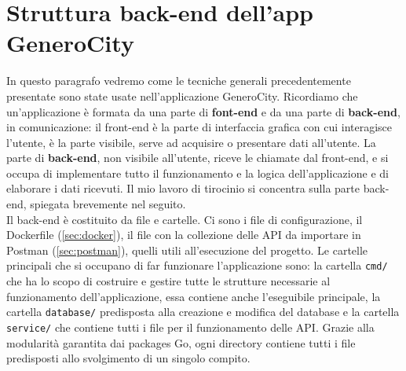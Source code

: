 \documentclass[italian, Lau, oneside, nodefaultfont, noexaminfo]{sapthesis}
\begin{document}




\section{Struttura back-end dell'app GeneroCity}

In questo paragrafo vedremo come le tecniche generali precedentemente presentate sono state usate nell'applicazione GeneroCity. Ricordiamo che un'applicazione \`e formata da una parte  di \textbf{font-end} e da una parte  di \textbf{back-end}, in comunicazione: il front-end  \`e la parte di interfaccia grafica con cui interagisce l'utente, \`e la parte visibile,  serve ad acquisire o presentare   dati  all'utente. La parte  di \textbf{back-end}, non visibile all'utente,  riceve le chiamate dal front-end, e si occupa di implementare tutto il funzionamento e la logica dell'applicazione e di elaborare i dati ricevuti. Il mio lavoro di tirocinio si concentra sulla parte back-end, spiegata brevemente nel seguito.\\

Il back-end è costituito da file e cartelle. Ci sono i file di configurazione, il Dockerfile (\autoref{sec:docker}), il file con la collezione delle API da importare in Postman (\autoref{sec:postman}), quelli utili all'esecuzione del progetto. Le cartelle principali  che si occupano di far funzionare l'applicazione sono: la cartella \texttt{cmd/} che ha lo scopo di costruire e gestire tutte le strutture necessarie al funzionamento dell'applicazione, essa  contiene anche l'eseguibile principale, la cartella \texttt{database/} predisposta alla creazione e modifica del database e la cartella \texttt{service/} che contiene tutti i file per il funzionamento delle  API. Grazie alla modularit\`a garantita dai packages Go, ogni directory contiene tutti i file  predisposti allo svolgimento di un singolo compito.
\end{document}
